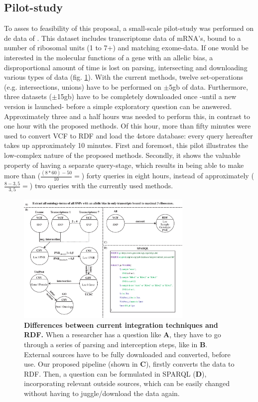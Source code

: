 \documentclass[twoside,fontsize=10pt]{article}
\begin{document}
\subsection*{Pilot-study}
To asses to feasibility of this proposal, a small-scale pilot-study was performed on de data of \citet{VanHeesch2014}. This dataset includes transcriptome data of mRNA's, bound to a number of ribosomal units (1 to 7+) and matching exome-data. If one would be interested in the molecular functions of a gene with an allelic bias, a disproportional amount of time is lost on parsing, intersecting and downloading various types of data (fig. \ref{fig:awesome_image}). With the current methods, twelve set-operations (e.g. intersections, unions) have to be performed on $\pm$5gb of data. Furthermore, three datasets ($\pm$15gb) have to be completely downloaded once -until a new version is launched- before a simple exploratory question can be answered. Approximately three and a half hours was needed to perform this, in contrast to one hour with the proposed methods. Of this hour, more than fifty minutes were used to convert VCF to RDF and load the 4store database: every query hereafter takes up approximately 10 minutes. First and foremost, this pilot illustrates the low-complex nature of the proposed methods. Secondly, it shows the valuable property of having a separate query-stage, which results in being able to make more than ($\frac{(8*60)-50}{10}= $) forty queries in eight hours, instead of approximately ($\frac{8-3,5}{3,5}= $) two queries with the currently used methods.
\begin{figure}[h!]
    \centering
    \includegraphics[width=0.75\textwidth]{DifferencesInDoingThings}
    \caption{\textbf{Differences between current integration techniques and RDF.} When a researcher has a question like \textbf{A}, they have to go through a series of parsing and interception steps, like in \textbf{B}. External sources have to be fully downloaded and converted, before use. Our proposed pipeline (shown in \textbf{C}), firstly converts the data to RDF. Then, a question can be formulated in SPARQL (\textbf{D}), incorporating relevant outside sources, which can be easily changed without having to juggle/download the data again.}
    \label{fig:awesome_image}
\end{figure}
\newpage
\end{document}
